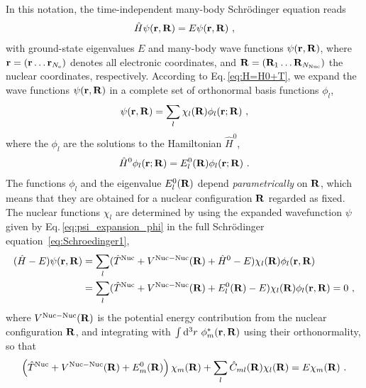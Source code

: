 %
In this notation, the time-independent many-body Schr\"odinger equation reads
\begin{align}
    \hat{H} \psi ({\bf r}, {\bf R}) = E \psi ({\bf r}, {\bf R})~,
    \label{eq:Schroedinger1}
\end{align}
with ground-state eigenvalues $E$ and many-body wave functions \mbox{$\psi ({\bf r}, {\bf R})$}, where {${\bf r} = ({\bf r} \ldots {\bf r}_{N_{\rm e}})$} denotes all electronic coordinates, and ${\bf R} = ({\bf R}_1 \ldots {\bf R}_{N_{\rm Nuc}})$ the nuclear coordinates, respectively. According to Eq.\,\eqref{eq:H=H0+T}, we expand the wave functions $\psi ({\bf r}, {\bf R})$ in a complete set of orthonormal basis functions $\phi_l$,
\begin{align}
\psi ({\bf r}, {\bf R}) = \sum_l \chi_l ({\bf R}) \phi_l ({\bf r}; {\bf R})~,
\label{eq:psi_expansion_phi}
\end{align}
where the $\phi_l$ are the solutions to the Hamiltonian $\hat{H}^0$,
\begin{align}
    \hat{H}^0 \phi_l ({\bf r}; {\bf R})
        = E^0_l ({\bf R}) \phi_l ({\bf r}; {\bf R})~.
    \label{eq:Hsolution1}
\end{align}
The functions $\phi_l$ and the eigenvalue $E_l^0({\bf R})$ depend \emph{parametrically} on $\bf R$, which means that they are obtained for a nuclear configuration $\bf R$ regarded as fixed.
The nuclear functions $\chi_l$ are determined by using the expanded wavefunction $\psi$ given by Eq.\,\eqref{eq:psi_expansion_phi} in the full Schr\"odinger equation~\eqref{eq:Schroedinger1},
\begin{align}
    (\hat{H} - E) \psi ({\bf r}, {\bf R})
        & = \sum_l (\hat{T}^{\rm Nuc} + {{V}}^{\mathrm{Nuc}-\mathrm{Nuc}} ({\bf R}) + \hat{H}^0 - E) \chi_l ({\bf R}) \phi_l ({\bf r}, {\bf R}) \nonumber \\
        &= \sum_l (\hat{T}^{\rm Nuc} + {{V}}^{\mathrm{Nuc}-\mathrm{Nuc}} ({\bf R}) + E^0_l({\bf R}) - E) \chi_l ({\bf R}) \phi_l ({\bf r}, {\bf R}) = 0~,
\end{align}
%
where $V^{\mathrm{Nuc}-\mathrm{Nuc}} ({\bf R})$ is the potential energy contribution from the nuclear configuration $\bf R$,
and integrating with $\int {\rm d}^3 r ~ \phi^\ast_m ({\bf r}, {\bf R})$ using their orthonormality, so that
\begin{align}
    \left( \hat{T}^{\rm Nuc} + {{V}}^{\mathrm{Nuc}-\mathrm{Nuc}} ({\bf R}) + E^0_m({\bf R}) \right) \chi_m ({\bf R})
        + \sum_l \hat{C}_{ml} ({\bf R}) \chi_l ({\bf R})
        = E \chi_m ({\bf R})~.
    \label{eq:chi1}
\end{align}
